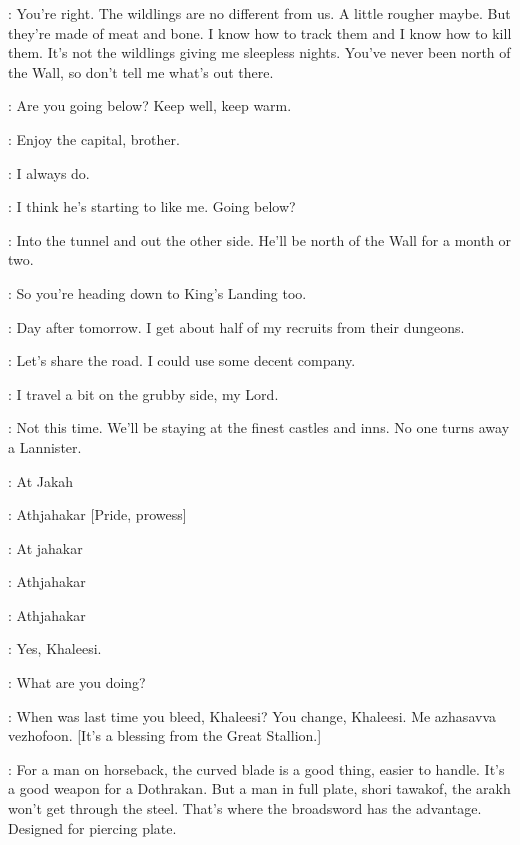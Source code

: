 \BENJEN: You're right. The wildlings are no different from us. A little rougher maybe. But they're made of meat and bone. I know how to track them and I know how to kill them. It's not the wildlings giving me sleepless nights. You've never been north of the Wall, so don't tell me what's out there. 

\YOREN: Are you going below? Keep well, keep warm. 

\BENJEN: Enjoy the capital, brother. 

\YOREN: I always do. 


\TYRION: I think he's starting to like me. Going below? 

\YOREN: Into the tunnel and out the other side. He'll be north of the Wall for a month or two. 

\TYRION: So you're heading down to King's Landing too. 

\YOREN: Day after tomorrow. I get about half of my recruits from their dungeons. 

\TYRION: Let's share the road. I could use some decent company. 

\YOREN: I travel a bit on the grubby side, my Lord. 

\TYRION: Not this time. We'll be staying at the finest castles and inns. No one turns away a Lannister. 

\scene



\DAENERYS: At Jakah

\IRRI: Athjahakar [Pride, prowess]

\DAENERYS: At jahakar

\IRRI: Athjahakar

\DAENERYS: Athjahakar

\IRRI: Yes, Khaleesi. 


\DAENERYS: What are you doing? 

\IRRI: When was last time you bleed, Khaleesi? You change, Khaleesi. Me azhasavva vezhofoon. [It's a blessing from the Great Stallion.]


\scene


\JORAH: For a man on horseback, the curved blade is a good thing, easier to handle. It's a good weapon for a Dothrakan. But a man in full plate, shori tawakof, the arakh won't get through the steel. That's where the broadsword has the advantage. Designed for piercing plate. 

